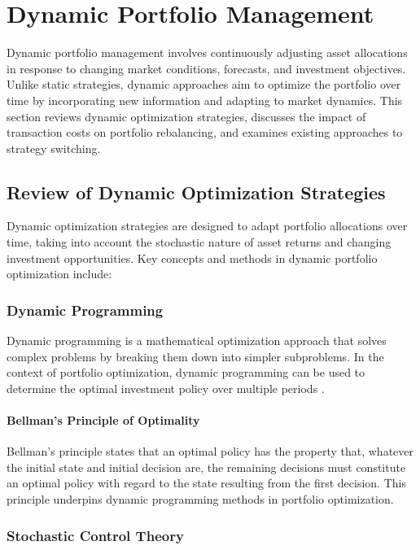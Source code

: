 \section{Dynamic Portfolio Management}

Dynamic portfolio management involves continuously adjusting asset allocations in response to changing market conditions, forecasts, and investment objectives. Unlike static strategies, dynamic approaches aim to optimize the portfolio over time by incorporating new information and adapting to market dynamics. This section reviews dynamic optimization strategies, discusses the impact of transaction costs on portfolio rebalancing, and examines existing approaches to strategy switching.

\subsection{Review of Dynamic Optimization Strategies}

Dynamic optimization strategies are designed to adapt portfolio allocations over time, taking into account the stochastic nature of asset returns and changing investment opportunities. Key concepts and methods in dynamic portfolio optimization include:

\subsubsection{Dynamic Programming}

Dynamic programming is a mathematical optimization approach that solves complex problems by breaking them down into simpler subproblems. In the context of portfolio optimization, dynamic programming can be used to determine the optimal investment policy over multiple periods \cite{bellman1957dynamic}.

\paragraph{Bellman's Principle of Optimality}

Bellman's principle states that an optimal policy has the property that, whatever the initial state and initial decision are, the remaining decisions must constitute an optimal policy with regard to the state resulting from the first decision. This principle underpins dynamic programming methods in portfolio optimization.

\subsubsection{Stochastic Control Theory}

